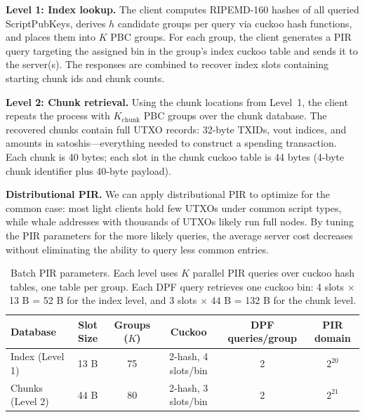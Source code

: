 \textbf{Level 1: Index lookup.} The client computes RIPEMD-160 hashes of all queried ScriptPubKeys, derives $h$ candidate groups per query via cuckoo hash functions, and places them into $K$ PBC groups. For each group, the client generates a PIR query targeting the assigned bin in the group's index cuckoo table and sends it to the server(s). The responses are combined to recover index slots containing starting chunk ids and chunk counts.

\textbf{Level 2: Chunk retrieval.} Using the chunk locations from Level~1, the client repeats the process with $K_\text{chunk}$ PBC groups over the chunk database. The recovered chunks contain full UTXO records: 32-byte TXIDs, vout indices, and amounts in satoshis---everything needed to construct a spending transaction. Each chunk is 40 bytes; each slot in the chunk cuckoo table is 44 bytes (4-byte chunk identifier plus 40-byte payload).

\textbf{Distributional PIR.} We can apply distributional PIR \cite{lehmkuhl25} to optimize for the common case: most light clients hold few UTXOs under common script types, while whale addresses with thousands of UTXOs likely run full nodes. By tuning the PIR parameters for the more likely queries, the average server cost decreases without eliminating the ability to query less common entries.

\begin{table}[htbp]
\centering
\begin{tabular}{|l|c|c|c|c|c|}
\hline
\textbf{Database} & \textbf{Slot Size} & \textbf{Groups ($K$)} & \textbf{Cuckoo} & \textbf{DPF queries/group} & \textbf{PIR domain} \\
\hline
Index (Level 1) & 13 B & 75 & 2-hash, 4 slots/bin & 2 & $2^{20}$ \\
Chunks (Level 2) & 44 B & 80 & 2-hash, 3 slots/bin & 2 & $2^{21}$ \\
\hline
\end{tabular}
\caption{Batch PIR parameters. Each level uses $K$ parallel PIR queries over cuckoo hash tables, one table per group. Each DPF query retrieves one cuckoo bin: 4 slots $\times$ 13 B = 52 B for the index level, and 3 slots $\times$ 44 B = 132 B for the chunk level.}
\label{tab:databases}
\end{table}
